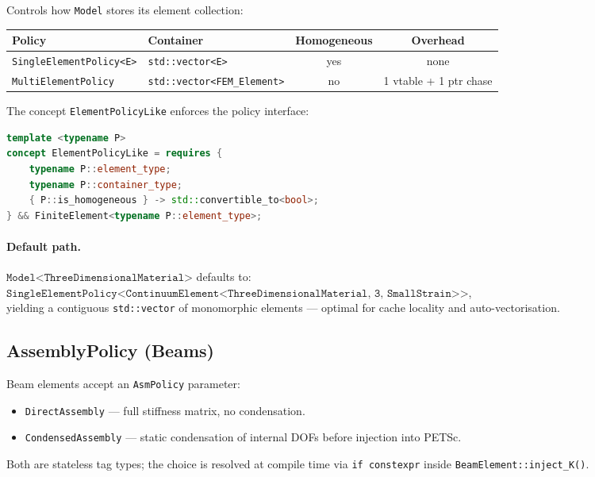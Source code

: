 Controls how \texttt{Model} stores its element collection:

\begin{center}
\small
\begin{tabular}{lp{4.5cm}cc}
  \toprule
  Policy & Container & Homogeneous & Overhead \\
  \midrule
  \texttt{SingleElementPolicy<E>} & \texttt{std::vector<E>}
    & yes & none \\
  \texttt{MultiElementPolicy}     & \texttt{std::vector<FEM\_Element>}
    & no  & 1 vtable + 1 ptr chase \\
  \bottomrule
\end{tabular}
\end{center}

The concept \texttt{ElementPolicyLike} enforces the policy interface:
\begin{lstlisting}[language=C++]
template <typename P>
concept ElementPolicyLike = requires {
    typename P::element_type;
    typename P::container_type;
    { P::is_homogeneous } -> std::convertible_to<bool>;
} && FiniteElement<typename P::element_type>;
\end{lstlisting}

\paragraph{Default path.}
$\texttt{Model<ThreeDimensionalMaterial>}$ defaults to:\\
$\texttt{SingleElementPolicy<ContinuumElement<ThreeDimensionalMaterial, 3,}$
$\texttt{SmallStrain>>}$,\\
yielding a contiguous \texttt{std::vector} of monomorphic elements --- optimal
for cache locality and auto-vectorisation.


\subsection{AssemblyPolicy (Beams)}

Beam elements accept an \texttt{AsmPolicy} parameter:
\begin{itemize}[nosep]
  \item \texttt{DirectAssembly} --- full stiffness matrix, no condensation.
  \item \texttt{CondensedAssembly} --- static condensation of internal DOFs
        before injection into PETSc.
\end{itemize}
Both are stateless tag types; the choice is resolved at compile time via
\texttt{if constexpr} inside \texttt{BeamElement::inject\_K()}.

